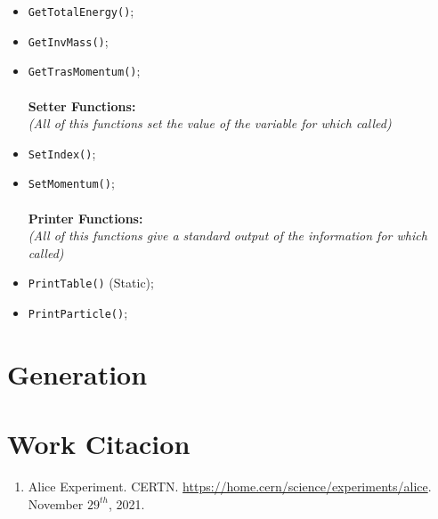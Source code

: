 \documentclass[a4paper, 11pt]{article}
\begin{document}
\begin{itemize}
        \item{\verb|GetTotalEnergy()|; }
        \item{\verb|GetInvMass()|; }
        \item{\verb|GetTrasMomentum()|; }
        \\ \\ \textbf{Setter Functions:}
        \\\textit{(All of this functions set the value of the variable for which called)}
        \item{\verb|SetIndex()|; }
        \item{\verb|SetMomentum()|; }
        \\ \\ \textbf{Printer Functions:}
        \\\textit{(All of this functions give a standard output of the information for which called)}
        \item{\verb|PrintTable()| (Static); }
        \item{\verb|PrintParticle()|; }
      \end{itemize}
    \section{Generation}

    \section* {Work Citacion}
    \begin{enumerate}
      \item{Alice Experiment. CERTN. \url{https://home.cern/science/experiments/alice}. November $29^{th}$, 2021.}
    \end{enumerate}
\end{document}
